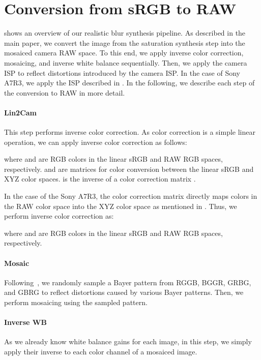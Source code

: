 \section{Conversion from sRGB to RAW}

 shows an overview of our realistic blur synthesis pipeline.
As described in the main paper, we convert the image from the saturation synthesis step into the mosaiced camera RAW space.
To this end, we apply inverse color correction, mosaicing, and inverse white balance sequentially.
Then, we apply the camera ISP to reflect distortions introduced by the camera ISP.
In the case of Sony A7R3, we apply the ISP described in .
In the following, we describe each step of the conversion to RAW in more detail.

\paragraph{Lin2Cam}
This step performs inverse color correction.
As color correction is a simple linear operation, we can apply inverse color correction as follows:

where  and  are RGB colors in the linear sRGB and RAW RGB spaces, respectively.
 and  are matrices for color conversion between the linear sRGB and XYZ color spaces.  is the inverse of a color correction matrix . 


In the case of the Sony A7R3, the color correction matrix  directly maps colors in the RAW color space into the XYZ color space as mentioned in .
Thus, we perform inverse color correction as: 

where  and  are RGB colors in the linear sRGB and RAW RGB spaces, respectively.


\paragraph{Mosaic} Following~\cite{Guo_2019_CVPR}, we randomly sample a Bayer pattern from RGGB, BGGR, GRBG, and GBRG to reflect distortions caused by various Bayer patterns.
Then, we perform mosaicing using the sampled pattern.

\paragraph{Inverse WB}
As we already know white balance gains for each image, in this step, we simply apply their inverse  to each color channel of a mosaiced image.


